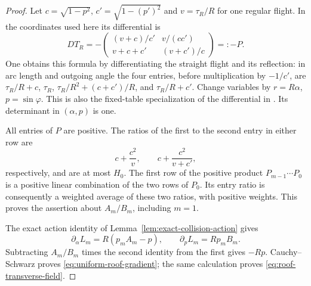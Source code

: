 \begin{proof}
Let $c=\sqrt{1-p^2}$, $c'=\sqrt{1-(p')^2}$ and $v=\tau_R/R$ for
one regular flight. In the coordinates used here its differential is
\begin{equation}\label{eq:positive-collision-matrix}
 D T_R=-\begin{pmatrix}
 (v+c)/c'&v/(cc')\\
 v+c+c'&(v+c')/c
 \end{pmatrix}=:-P.
\end{equation}
One obtains this formula by differentiating the straight flight and
its reflection: in arc length and outgoing angle the four entries,
before multiplication by $-1/c'$, are
$\tau_R/R+c$, $\tau_R$, $\tau_R/R^2+(c+c')/R$, and
$\tau_R/R+c'$. Change variables by $r=R\alpha$, $p=\sin\varphi$.
This is also the fixed-table specialization of the differential in
\cite[Section 3.1]{SYZ}. Its determinant in $(\alpha,p)$ is one.

All entries of $P$ are positive. The ratios of the first to the second
entry in either row are
\[
 c+\frac{c^2}{v},\qquad c+\frac{c^2}{v+c'},
\]
respectively, and are at most $H_0$. The first row of the positive
product $P_{m-1}\cdots P_0$ is a positive linear combination of the
two rows of $P_0$. Its entry ratio is consequently a weighted average
of these two ratios, with positive weights. This proves the assertion
about $A_m/B_m$, including $m=1$.

The exact action identity of Lemma~\ref{lem:exact-collision-action}
gives
\[
 \partial_\alpha L_m=R(p_m A_m-p),\qquad
 \partial_p L_m=Rp_m B_m.
\]
Subtracting $A_m/B_m$ times the second identity from the first gives
$-Rp$. Cauchy--Schwarz proves \eqref{eq:uniform-roof-gradient}; the
same calculation proves \eqref{eq:roof-transverse-field}.
\end{proof}

